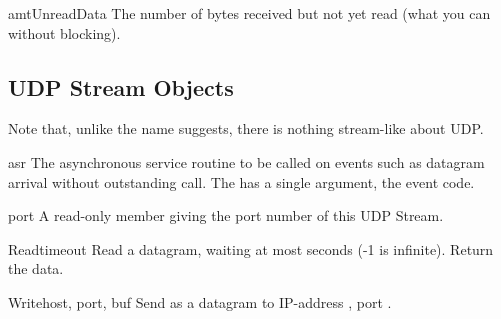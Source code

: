\begin{memberdesc}{amtUnreadData}
The number of bytes received but not yet read (what you can
 without blocking).
\end{memberdesc}



\subsection{UDP Stream Objects}

Note that, unlike the name suggests, there is nothing stream-like
about UDP.


\begin{memberdesc}{asr}
The asynchronous service routine to be called on events such as
datagram arrival without outstanding  call. The 
has a single argument, the event code.
\end{memberdesc}

\begin{memberdesc}{port}
A read-only member giving the port number of this UDP Stream.
\end{memberdesc}


\begin{methoddesc}{Read}{timeout}
Read a datagram, waiting at most  seconds (-1 is
infinite).  Return the data.
\end{methoddesc}

\begin{methoddesc}{Write}{host, port, buf}
Send  as a datagram to IP-address , port
.
\end{methoddesc}
